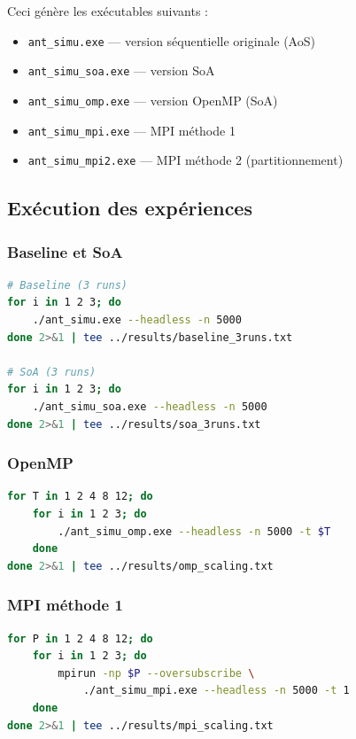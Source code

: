 \documentclass[11pt,a4paper]{article}
\begin{document}
Ceci génère les exécutables suivants :
\begin{itemize}[nosep]
    \item \texttt{ant\_simu.exe} --- version séquentielle originale (AoS)
    \item \texttt{ant\_simu\_soa.exe} --- version SoA
    \item \texttt{ant\_simu\_omp.exe} --- version OpenMP (SoA)
    \item \texttt{ant\_simu\_mpi.exe} --- MPI méthode 1
    \item \texttt{ant\_simu\_mpi2.exe} --- MPI méthode 2 (partitionnement)
\end{itemize}

\subsection{Exécution des expériences}

\subsubsection{Baseline et SoA}

\begin{lstlisting}[language=bash, caption={Mesure de la baseline et SoA}]
# Baseline (3 runs)
for i in 1 2 3; do
    ./ant_simu.exe --headless -n 5000
done 2>&1 | tee ../results/baseline_3runs.txt

# SoA (3 runs)
for i in 1 2 3; do
    ./ant_simu_soa.exe --headless -n 5000
done 2>&1 | tee ../results/soa_3runs.txt
\end{lstlisting}

\subsubsection{OpenMP}

\begin{lstlisting}[language=bash, caption={Passage à l'échelle OpenMP}]
for T in 1 2 4 8 12; do
    for i in 1 2 3; do
        ./ant_simu_omp.exe --headless -n 5000 -t $T
    done
done 2>&1 | tee ../results/omp_scaling.txt
\end{lstlisting}

\subsubsection{MPI méthode 1}

\begin{lstlisting}[language=bash, caption={Passage à l'échelle MPI méthode 1}]
for P in 1 2 4 8 12; do
    for i in 1 2 3; do
        mpirun -np $P --oversubscribe \
            ./ant_simu_mpi.exe --headless -n 5000 -t 1
    done
done 2>&1 | tee ../results/mpi_scaling.txt
\end{lstlisting}
\end{document}
